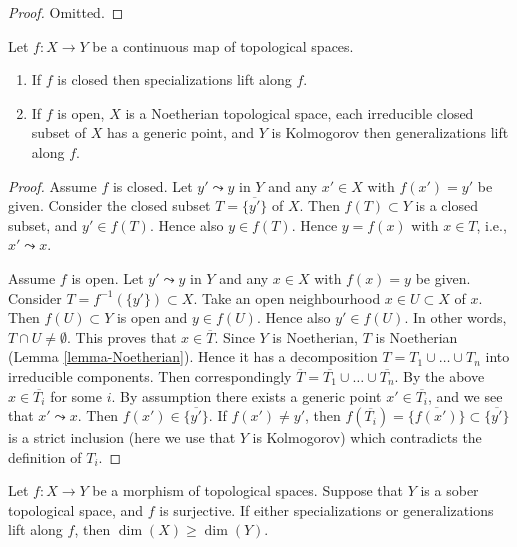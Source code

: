 \begin{proof}
Omitted.
\end{proof}

\begin{lemma}
\label{lemma-closed-open-map-specialization}
Let $f : X \to Y$ be a continuous map of topological spaces.
\begin{enumerate}
\item If $f$ is closed then specializations lift along $f$.
\item If $f$ is open, $X$ is a Noetherian topological space,
each irreducible closed subset of $X$ has a generic point,
and $Y$ is Kolmogorov then generalizations lift along $f$.
\end{enumerate}
\end{lemma}

\begin{proof}
Assume $f$ is closed. Let $y' \leadsto y$ in $Y$ and any $x'\in X$ with
$f(x') = y'$ be given. Consider the closed subset $T = \overline{\{y'\}}$
of $X$. Then $f(T) \subset Y$ is a closed subset, and $y' \in f(T)$.
Hence also $y \in f(T)$. Hence $y = f(x)$ with $x \in T$, i.e.,
$x' \leadsto x$.

\medskip\noindent
Assume $f$ is open. Let $y' \leadsto y$ in $Y$ and any $x \in X$ with
$f(x) = y$ be given. Consider $T = f^{-1}(\{y'\}) \subset X$.
Take an open neighbourhood $x \in U \subset X$ of $x$.
Then $f(U) \subset Y$ is open and $y \in f(U)$. Hence also $y' \in f(U)$.
In other words, $T \cap U \not = \emptyset$. This proves that
$x \in \overline{T}$. Since $Y$ is Noetherian, $T$ is Noetherian
(Lemma \ref{lemma-Noetherian}).
Hence it has a decomposition $T = T_1 \cup \ldots \cup T_n$ into irreducible
components. Then correspondingly
$\overline{T} = \overline{T_1} \cup \ldots \cup \overline{T_n}$.
By the above $x \in \overline{T_i}$ for some $i$. By assumption
there exists a generic point $x' \in \overline{T_i}$, and
we see that $x' \leadsto x$.
Then $f(x') \in \overline{\{y'\}}$. If $f(x') \not = y'$, then
$f(\overline{T_i}) = \overline{\{f(x')\}} \subset \overline{\{y'\}}$
is a strict inclusion (here we use that $Y$ is Kolmogorov)
which contradicts the definition of $T_i$.
\end{proof}

\begin{lemma}
\label{lemma-dimension-specializations-lift}
Let $f : X \to Y$ be a morphism of topological spaces.
Suppose that $Y$ is a sober topological space, and $f$ is surjective.
If either specializations or generalizations lift along $f$, then
$\dim(X) \geq \dim(Y)$.
\end{lemma}

